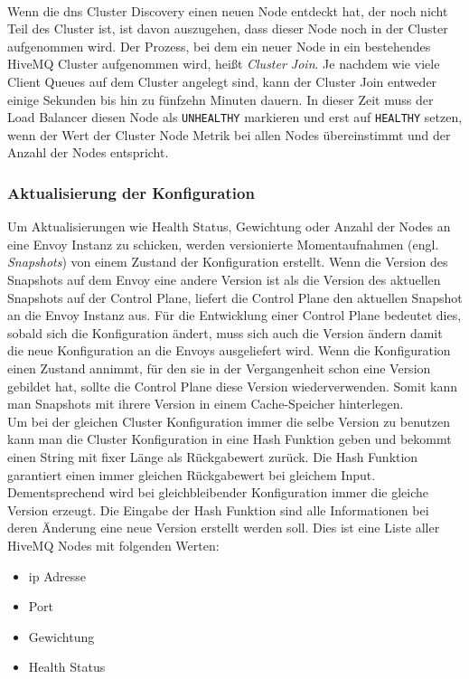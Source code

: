 \\
Wenn die \ac{dns} Cluster Discovery einen neuen Node entdeckt hat, der noch nicht Teil des Cluster ist, ist davon auszugehen, dass dieser Node noch in der Cluster aufgenommen wird. Der Prozess, bei dem ein neuer Node in ein bestehendes HiveMQ Cluster aufgenommen wird, hei{\ss}t \textit{Cluster Join}. Je nachdem wie viele Client Queues auf dem Cluster angelegt sind, kann der Cluster Join entweder einige Sekunden bis hin zu fünfzehn Minuten dauern. In dieser Zeit muss der Load Balancer diesen Node als \verb|UNHEALTHY| markieren und erst auf \verb|HEALTHY| setzen, wenn der Wert der Cluster Node Metrik bei allen Nodes übereinstimmt und der Anzahl der Nodes entspricht.

\subsubsection{Aktualisierung der Konfiguration}
Um Aktualisierungen wie Health Status, Gewichtung oder Anzahl der Nodes an eine Envoy Instanz zu schicken, werden versionierte Momentaufnahmen (engl. \textit{Snapshots}) von einem Zustand der Konfiguration erstellt. Wenn die Version des Snapshots auf dem Envoy eine andere Version ist als die Version des aktuellen Snapshots auf der Control Plane, liefert die Control Plane den aktuellen Snapshot an die Envoy Instanz aus.
Für die Entwicklung einer Control Plane bedeutet dies, sobald sich die Konfiguration ändert, muss sich auch die Version ändern damit die neue Konfiguration an die Envoys ausgeliefert wird. Wenn die Konfiguration einen Zustand annimmt, für den sie in der Vergangenheit schon eine Version gebildet hat, sollte die Control Plane diese Version wiederverwenden. Somit kann man Snapshots mit ihrere Version in einem Cache-Speicher hinterlegen.
\\
Um bei der gleichen Cluster Konfiguration immer die selbe Version zu benutzen kann man die Cluster Konfiguration in eine Hash Funktion geben und bekommt einen String mit fixer Länge als Rückgabewert zurück. Die Hash Funktion garantiert einen immer gleichen Rückgabewert bei gleichem Input. Dementsprechend wird bei gleichbleibender Konfiguration immer die gleiche Version erzeugt.
Die Eingabe der Hash Funktion sind alle Informationen bei deren Änderung eine neue Version erstellt werden soll. Dies ist eine Liste aller HiveMQ Nodes mit folgenden Werten:
\begin{itemize}
  \item \ac{ip} Adresse
  \item Port
  \item Gewichtung
  \item Health Status
\end{itemize}
